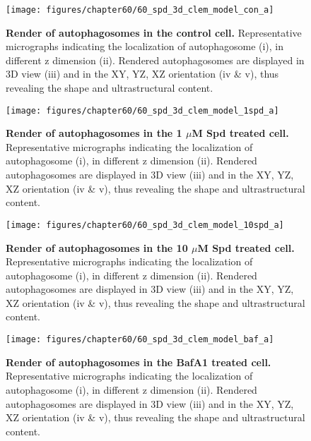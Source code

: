 \begin{figure}[!htbp]
\center
 \texttt{[image: figures/chapter60/60\_spd\_3d\_clem\_model\_con\_a]}
 \caption[Render of autophagosomes in the control cell]{\textbf{Render of autophagosomes in the control cell.} Representative micrographs indicating the localization of autophagosome (i), in different z dimension (ii). Rendered autophagosomes are displayed in 3D view (iii) and in the XY, YZ, XZ orientation (iv \& v), thus revealing the shape and ultrastructural content.}
 \label{fig:60_spd_3d_clem_model_con_a}
\end{figure} 

\begin{figure}[!htbp]
\center
 \texttt{[image: figures/chapter60/60\_spd\_3d\_clem\_model\_1spd\_a]}
 \caption[Render of autophagosomes in the 1 $\mu$M Spd treated cell]{\textbf{Render of autophagosomes in the 1 $\mu$M Spd treated cell.} Representative micrographs indicating the localization of autophagosome (i), in different z dimension (ii). Rendered autophagosomes are displayed in 3D view (iii) and in the XY, YZ, XZ orientation (iv \& v), thus revealing the shape and ultrastructural content.}
 \label{fig:60_spd_3d_clem_model_1spd_a}
\end{figure} 

\begin{figure}[!htbp]
\center
 \texttt{[image: figures/chapter60/60\_spd\_3d\_clem\_model\_10spd\_a]}
 \caption[Render of autophagosomes in the 10 $\mu$M Spd treated cell]{\textbf{Render of autophagosomes in the 10 $\mu$M Spd treated cell.} Representative micrographs indicating the localization of autophagosome (i), in different z dimension (ii). Rendered autophagosomes are displayed in 3D view (iii) and in the XY, YZ, XZ orientation (iv \& v), thus revealing the shape and ultrastructural content.}
 \label{fig:60_spd_3d_clem_model_10spd_a}
\end{figure} 

\begin{figure}[!htbp]
\center
 \texttt{[image: figures/chapter60/60\_spd\_3d\_clem\_model\_baf\_a]}
 \caption[Render of autophagosomes in the BafA1 treated cell]{\textbf{Render of autophagosomes in the BafA1 treated cell.} Representative micrographs indicating the localization of autophagosome (i), in different z dimension (ii). Rendered autophagosomes are displayed in 3D view (iii) and in the XY, YZ, XZ orientation (iv \& v), thus revealing the shape and ultrastructural content.}
 \label{fig:60_spd_3d_clem_model_baf_a}
\end{figure} 

